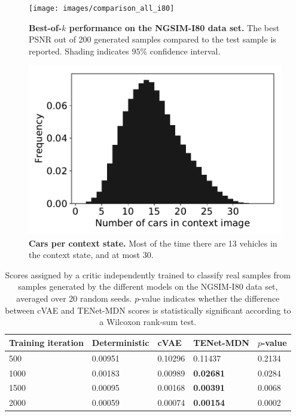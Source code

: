 \documentclass{article}
\begin{document}
\begin{figure}[t!]
  \begin{minipage}[t]{0.49 \textwidth}
    \centering
    \texttt{[image: images/comparison\_all\_i80]}
    \caption{
      \textbf{Best-of-$k$ performance on the NGSIM-I80 data set.}
      The best PSNR out of 200 generated samples compared to the test sample is reported.
      Shading indicates $95\%$ confidence interval.
    }
    \label{best-of-k-i80}
  \end{minipage} \quad%
  \begin{minipage}[t]{0.49 \textwidth}
    \centering
    \includegraphics[width=\textwidth]{images/car_statistics}
    \caption{
      \textbf{Cars per context state.}
      Most of the time there are 13 vehicles in the context state, and at most 30.
    }
    \label{car-statistics}
  \end{minipage}
\end{figure}

\begin{table}[t!]
  \caption{
    Scores assigned by a critic independently trained to classify real samples from samples generated by the different models on the NGSIM-I80 data set, averaged over 20 random seeds.
    $p$-value indicates whether the difference between cVAE and TENet-MDN scores is statistically significant according to a Wilcoxon rank-sum test.
  }
  \label{critic-table}
  \centering
  \begin{tabular}{l|l|lll}
    \toprule
    Training iteration     & Deterministic & cVAE & TENet-MDN & $p$-value \\
    \midrule
    500 & 0.00951 & 0.10296 & 0.11437 & 0.2134 \\
    1000 & 0.00183 & 0.00989 & \textbf{0.02681} & 0.0284 \\
    1500 & 0.00095 & 0.00168 & \textbf{0.00391} & 0.0068 \\
    2000 & 0.00059 & 0.00074 & \textbf{0.00154} & 0.0002 \\
    \bottomrule
  \end{tabular}
\end{table}
\end{document}

